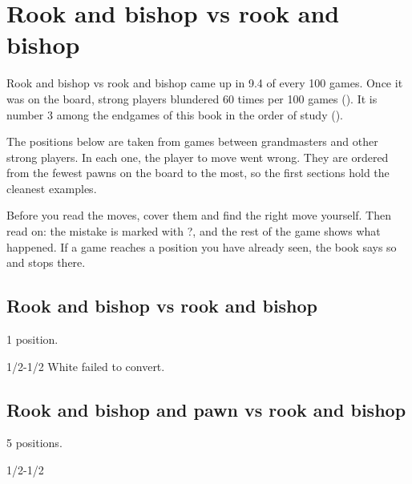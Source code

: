 \chapter{Rook and bishop vs rook and bishop}\label{ch:rook-and-bishop-vs-rook-and-bishop}
Rook and bishop vs rook and bishop came up in 9.4 of every 100 games. Once it was on the board, strong players blundered 60 times per 100 games (). It is number 3 among the endgames of this book in the order of study ().

The positions below are taken from games between grandmasters and other strong players. In each one, the player to move went wrong. They are ordered from the fewest pawns on the board to the most, so the first sections hold the cleanest examples.

Before you read the moves, cover them and find the right move yourself. Then read on: the mistake is marked with ?, and the rest of the game shows what happened. If a game reaches a position you have already seen, the book says so and stops there.


\section{Rook and bishop vs rook and bishop}
1 position.


1/2-1/2 White failed to convert.\par
\section{Rook and bishop and pawn vs rook and bishop}
5 positions.


1/2-1/2\par
{}

